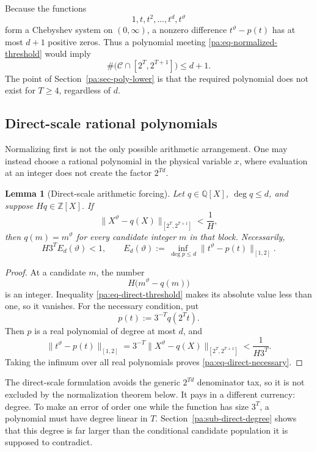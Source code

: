 \documentclass[11pt,oneside]{article}
\newtheorem{lemma}[theorem]{Lemma}
\theoremstyle{definition}
\theoremstyle{remark}
\newcommand{\Z}{\mathbb Z}
\newcommand{\Q}{\mathbb Q}
\newcommand{\thetaq}{\vartheta}
\newcommand{\Cand}{\mathcal C}
\begin{document}
Because the functions
\[
 1,t,t^2,\ldots,t^d,t^{\thetaq}
\]
form a Chebyshev system on \((0,\infty)\), a nonzero difference
\(t^{\thetaq}-p(t)\) has at most \(d+1\) positive zeros.  Thus a polynomial meeting
\eqref{pa:eq-normalized-threshold} would imply
\begin{equation}
 \#\bigl(\Cand\cap[2^T,2^{T+1}]\bigr)\le d+1.
 \label{pa:eq-normalized-count}
\end{equation}
The point of Section~\ref{pa:sec-poly-lower} is that the required polynomial does not exist
for \(T\ge4\), regardless of \(d\).

\subsection{Direct-scale rational polynomials}

Normalizing first is not the only possible arithmetic arrangement.  One may instead choose a
rational polynomial in the physical variable \(x\), where evaluation at an integer does not
create the factor \(2^{Td}\).

\begin{lemma}[Direct-scale arithmetic forcing]
\label{pa:lem-direct-resolution}
Let \(q\in\Q[X]\), \(\deg q\le d\), and suppose \(Hq\in\Z[X]\).  If
\begin{equation}
 \bigl\|X^{\thetaq}-q(X)\bigr\|_{[2^T,2^{T+1}]}
 <\frac1H,
 \label{pa:eq-direct-threshold}
\end{equation}
then \(q(m)=m^{\thetaq}\) for every candidate integer \(m\) in that block.  Necessarily,
\begin{equation}
 H3^T E_d(\thetaq)<1,
 \qquad
 E_d(\thetaq):=
 \inf_{\deg p\le d}\|t^{\thetaq}-p(t)\|_{[1,2]}.
 \label{pa:eq-direct-necessary}
\end{equation}
\end{lemma}

\begin{proof}
At a candidate \(m\), the number
\[
 H\bigl(m^{\thetaq}-q(m)\bigr)
\]
is an integer.  Inequality \eqref{pa:eq-direct-threshold} makes its absolute value less than
one, so it vanishes.  For the necessary condition, put
\[
 p(t):=3^{-T}q(2^Tt).
\]
Then \(p\) is a real polynomial of degree at most \(d\), and
\[
 \|t^{\thetaq}-p(t)\|_{[1,2]}
 =3^{-T}\|X^{\thetaq}-q(X)\|_{[2^T,2^{T+1}]}
 <\frac{1}{H3^T}.
\]
Taking the infimum over all real polynomials proves \eqref{pa:eq-direct-necessary}.
\end{proof}

The direct-scale formulation avoids the generic \(2^{Td}\) denominator tax, so it is not
excluded by the normalization theorem below.  It pays in a different currency: degree.  To
make an error of order one while the function has size \(3^T\), a polynomial must have degree
linear in \(T\).  Section~\ref{pa:sub-direct-degree} shows that this degree is far larger than
the conditional candidate population it is supposed to contradict.
\end{document}
